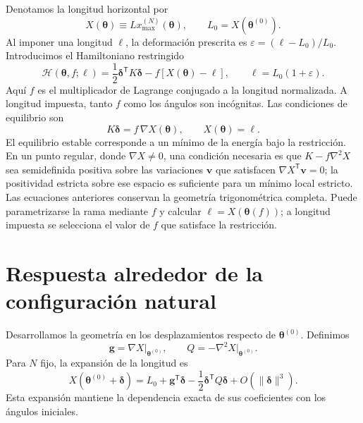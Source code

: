 \documentclass[11pt,a4paper]{article}
\begin{document}
Denotamos la longitud horizontal por
\begin{equation}
X(\boldsymbol\theta)\equiv Lx_{\max}^{(N)}(\boldsymbol\theta),
\qquad L_0=X(\boldsymbol\theta^{(0)}).
\label{eq:X_def}
\end{equation}
Al imponer una longitud $\ell$, la deformación prescrita es
$\varepsilon=(\ell-L_0)/L_0$. Introducimos el Hamiltoniano restringido
\begin{equation}
\boxed{
\mathcal H(\boldsymbol\theta,f;\ell)
=\frac12\boldsymbol\delta^{\mathsf T}K\boldsymbol\delta
-f\left[X(\boldsymbol\theta)-\ell\right],
\qquad \ell=L_0(1+\varepsilon).
}
\label{eq:H_def_ki}
\end{equation}
Aquí $f$ es el multiplicador de Lagrange conjugado a la longitud
normalizada. A longitud impuesta, tanto $f$ como los ángulos son
incógnitas. Las condiciones de equilibrio son
\begin{equation}
\boxed{
K\boldsymbol\delta=f\,\nabla X(\boldsymbol\theta),
\qquad X(\boldsymbol\theta)=\ell.
}
\label{eq:equilibrium_general}
\end{equation}
El equilibrio estable corresponde a un mínimo de la energía bajo
la restricción. En un punto regular, donde $\nabla X\neq0$, una
condición necesaria es que $K-f\nabla^2X$ sea semidefinida positiva
sobre las variaciones $\mathbf v$ que satisfacen
$\nabla X^{\mathsf T}\mathbf v=0$; la positividad estricta sobre
ese espacio es suficiente para un mínimo local estricto.
Las ecuaciones anteriores conservan la geometría trigonométrica
completa. Puede parametrizarse la rama mediante $f$ y calcular
$\ell=X(\boldsymbol\theta(f))$; a longitud impuesta se selecciona
el valor de $f$ que satisface la restricción.

\section{Respuesta alrededor de la configuración natural}
\label{sec:small}

Desarrollamos la geometría en los desplazamientos respecto de
$\boldsymbol\theta^{(0)}$.
Definimos
\begin{equation}
\mathbf g=\nabla X\big|_{\boldsymbol\theta^{(0)}},
\qquad Q=-\nabla^2X\big|_{\boldsymbol\theta^{(0)}}.
\end{equation}
Para $N$ fijo, la expansión de la longitud es
\begin{equation}
X(\boldsymbol\theta^{(0)}+\boldsymbol\delta)
=L_0+\mathbf g^{\mathsf T}\boldsymbol\delta
-\frac12\boldsymbol\delta^{\mathsf T}Q\boldsymbol\delta
+O(\|\boldsymbol\delta\|^3).
\label{eq:X_local}
\end{equation}
Esta expansión mantiene la dependencia exacta de sus coeficientes
con los ángulos iniciales.
\end{document}
